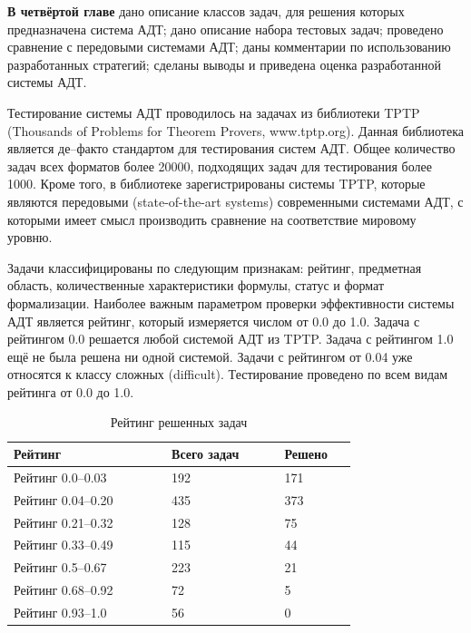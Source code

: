 \documentclass[a4paper]{report}
\begin{document}
\textbf{В четвёртой главе} дано описание классов задач, для решения которых предназначена система АДТ; дано описание набора тестовых задач; проведено сравнение с передовыми системами АДТ; даны комментарии по использованию разработанных стратегий; сделаны выводы и приведена оценка разработанной системы АДТ.

Тестирование системы АДТ проводилось на задачах из библиотеки TPTP (Thousands of Problems for Theorem Provers, www.tptp.org). Данная библиотека является де--факто стандартом для тестирования систем АДТ. Общее количество задач всех форматов более 20000, подходящих задач для тестирования более 1000. Кроме того,  в библиотеке зарегистрированы системы TPTP, которые являются передовыми (state-of-the-art systems) современными системами АДТ, с которыми имеет смысл производить сравнение на соответствие мировому уровню.

Задачи классифицированы по следующим признакам: рейтинг, предметная область, количественные характеристики формулы, статус и формат формализации. Наиболее важным параметром проверки эффективности системы АДТ является рейтинг, который измеряется числом от 0.0 до 1.0. Задача с рейтингом 0.0 решается любой системой АДТ из TPTP. Задача с рейтингом 1.0 ещё не была решена ни одной системой. Задачи с рейтингом от 0.04 уже относятся к классу сложных (difficult). Тестирование проведено по всем видам рейтинга от 0.0 до 1.0.



\setcounter{table}{0}

\begin{longtable}[tbh]{|p{0.35\linewidth}|p{0.25\linewidth}|p{0.15\linewidth}|}
\caption[Продолжение таблицы 1]{Рейтинг решенных задач}\label{tabli1}\\
\hline
\textbf{Рейтинг} & \textbf{Всего задач} & \textbf{Решено} \\
\hline
Рейтинг 0.0--0.03 & 192 & 171 \\
\hline
Рейтинг 0.04--0.20 & 435 & 373 \\
\hline
Рейтинг 0.21--0.32 & 128 & 75 \\
\hline
Рейтинг 0.33--0.49 & 115 & 44 \\
\hline
Рейтинг 0.5--0.67 & 223 & 21 \\
\hline
Рейтинг 0.68--0.92 & 72 & 5 \\
\hline
Рейтинг 0.93--1.0 & 56 & 0\\
\hline
\end{longtable}
\end{document}
